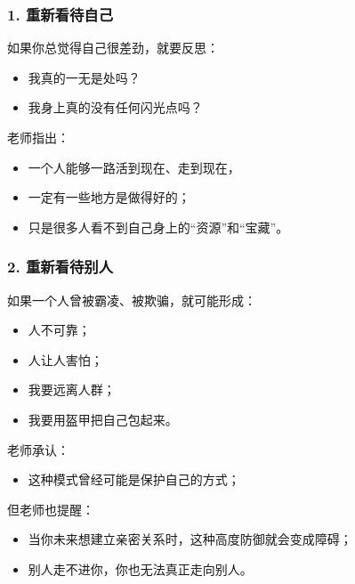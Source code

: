\documentclass[
  chinese,
  9pt,
  a4paper,
]{ctexart}
\providecommand{\tightlist}{%
  \setlength{\itemsep}{0pt}\setlength{\parskip}{0pt}}
\begin{document}
\subsubsection{1.
重新看待自己}\label{ux91cdux65b0ux770bux5f85ux81eaux5df1}

如果你总觉得自己很差劲，就要反思：

\begin{itemize}
\tightlist
\item
  我真的一无是处吗？
\item
  我身上真的没有任何闪光点吗？
\end{itemize}

老师指出：

\begin{itemize}
\tightlist
\item
  一个人能够一路活到现在、走到现在，
\item
  一定有一些地方是做得好的；
\item
  只是很多人看不到自己身上的``资源''和``宝藏''。
\end{itemize}

\subsubsection{2.
重新看待别人}\label{ux91cdux65b0ux770bux5f85ux522bux4eba}

如果一个人曾被霸凌、被欺骗，就可能形成：

\begin{itemize}
\tightlist
\item
  人不可靠；
\item
  人让人害怕；
\item
  我要远离人群；
\item
  我要用盔甲把自己包起来。
\end{itemize}

老师承认：

\begin{itemize}
\tightlist
\item
  这种模式曾经可能是保护自己的方式；
\end{itemize}

但老师也提醒：

\begin{itemize}
\tightlist
\item
  当你未来想建立亲密关系时，这种高度防御就会变成障碍；
\item
  别人走不进你，你也无法真正走向别人。
\end{itemize}
\end{document}
